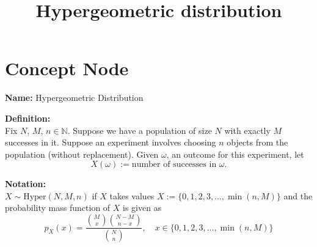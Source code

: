 \documentclass{article}
\title{Hypergeometric distribution}
\begin{document}
\maketitle

\section{Concept Node}

\textbf{Name:} Hypergeometric Distribution

\textbf{Definition:} \\
Fix \( N \), \( M \), \( n \in \mathbb{N} \). Suppose we have a population of size \( N \) with exactly \( M \) successes in it. Suppose an experiment involves choosing \( n \) objects from the population (without replacement). Given \( \omega \), an outcome for this experiment, let
\[
X(\omega) := \text{number of successes in } \omega.
\]

\textbf{Notation:} \\
\( X \sim \text{Hyper}(N, M, n) \) if \( X \) takes values \( X := \{0, 1, 2, 3, \ldots, \min(n, M)\} \)
and the probability mass function of \( X \) is given as
\[
p_X(x) = \frac{\binom{M}{x} \binom{N - M}{n - x}}{\binom{N}{n}}, \quad x \in \{0, 1, 2, 3, \ldots, \min(n, M)\}
\]
\end{document}
